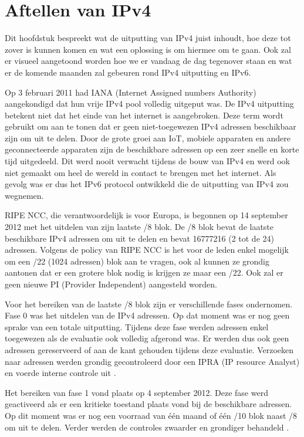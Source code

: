 
\chapter{Aftellen van IPv4}
\label{ch:h4}

Dit hoofdstuk bespreekt wat de uitputting van IPv4 juist inhoudt, hoe deze tot zover is kunnen komen en wat een oplossing is om hiermee om te gaan. Ook zal er visueel aangetoond worden hoe we er vandaag de dag tegenover staan en wat er de komende maanden zal gebeuren rond IPv4 uitputting en IPv6.

Op 3 februari 2011 had IANA (Internet Assigned numbers Authority) aangekondigd dat hun vrije IPv4 pool volledig uitgeput was. De IPv4 uitputting betekent niet dat het einde van het internet is aangebroken. Deze term wordt gebruikt om aan te tonen dat er geen niet-toegewezen IPv4 adressen beschikbaar zijn om uit te delen. Door de grote groei aan IoT, mobiele apparaten en andere geconnecteerde apparaten zijn de beschikbare adressen op een zeer snelle en korte tijd uitgedeeld. Dit werd nooit verwacht tijdens de bouw van IPv4 en werd ook niet gemaakt om heel de wereld in contact te brengen met het internet. Als gevolg was er dus het IPv6 protocol ontwikkeld die de uitputting van IPv4 zou wegnemen.

RIPE NCC, die verantwoordelijk is voor Europa, is begonnen op 14 september 2012 met het uitdelen van zijn laatste /8 blok. De /8 blok bevat de laatste beschikbare IPv4 adressen om uit te delen en bevat 16777216 (2 tot de 24) adressen. Volgens de policy van RIPE NCC is het voor de leden enkel mogelijk om een /22 (1024 adressen) blok aan te vragen, ook al kunnen ze grondig aantonen dat er een grotere blok nodig is krijgen ze maar een /22. Ook zal er geen nieuwe PI (Provider Independent) aangesteld worden.

Voor het bereiken van de laatste /8 blok zijn er verschillende fases ondernomen. Fase 0 was het uitdelen van de IPv4 adressen. Op dat moment was er nog geen sprake van een totale uitputting. Tijdens deze fase werden adressen enkel toegewezen als de evaluatie ook volledig afgerond was. Er werden dus ook geen adressen gereserveerd of aan de kant gehouden tijdens deze evaluatie. Verzoeken naar adressen werden grondig gecontroleerd door een IPRA (IP resource Analyst) en voerde interne controle uit \autocite{RIPE2016Fases}.

Het bereiken van fase 1 vond plaats op 4 september 2012. Deze fase werd geactiveerd als er een kritieke toestand plaats vond bij de beschikbare adressen. Op dit moment was er nog een voorraad van één maand of één /10 blok naast /8 om uit te delen. Verder werden de controles zwaarder en grondiger behandeld \autocite{RIPE2016Fases}.

